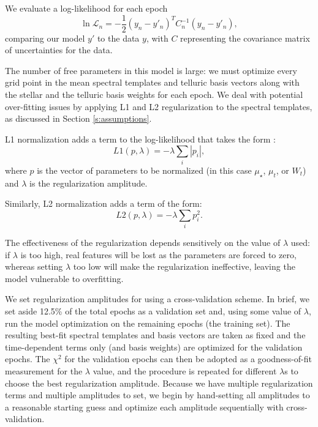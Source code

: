 \documentclass[modern]{aastex62}
\begin{document}
We evaluate a log-likelihood for each epoch
\begin{equation}
\ln \mathcal{L}_n = -\frac{1}{2} (y_{n} - y'_{n})^T C_{n}^{-1} (y_{n}-y'_{n}),
\end{equation}
comparing our model $y'$ to the data $y$, with $C$ representing the covariance matrix of uncertainties for the data.

The number of free parameters in this model is large: we must optimize every grid point in the mean spectral templates and telluric basis vectors along with the stellar \RV and the telluric basis weights for each epoch.
We deal with potential over-fitting issues by applying L1 and L2 regularization to the spectral templates, as discussed in Section \ref{s:assumptions}.

L1 normalization adds a term to the log-likelihood that takes the form :
$$ L1(p, \lambda) = -\lambda \sum_{i} | p_{i} | ,$$
where $p$ is the vector of parameters to be normalized (in this case $\mu_{{\star}}$, $\mu_{{t}}$, or $W_{t}$) and $\lambda$ is the regularization amplitude.

Similarly, L2 normalization adds a term of the form:
$$ L2(p, \lambda) = -\lambda \sum_{i} p_{i}^2 .$$

The effectiveness of the regularization depends sensitively on the value of $\lambda$ used: if $\lambda$ is too high, real features will be lost as the parameters are forced to zero, whereas setting $\lambda$ too low will make the regularization ineffective, leaving the model vulnerable to overfitting.

We set regularization amplitudes for \wobble using a cross-validation scheme.
In brief, we set aside 12.5\% of the total epochs as a validation set and, using some value of $\lambda$, run the model optimization on the remaining epochs (the training set).
The resulting best-fit spectral templates and basis vectors are taken as fixed and the time-dependent terms only (\RVs and basis weights) are optimized for the validation epochs.
The $\chi^2$ for the validation epochs can then be adopted as a goodness-of-fit measurement for the $\lambda$ value, and the procedure is repeated for different $\lambda$s to choose the best regularization amplitude.
Because we have multiple regularization terms and multiple amplitudes to set, we begin by hand-setting all amplitudes to a reasonable starting guess and optimize each amplitude sequentially with cross-validation.
\end{document}
